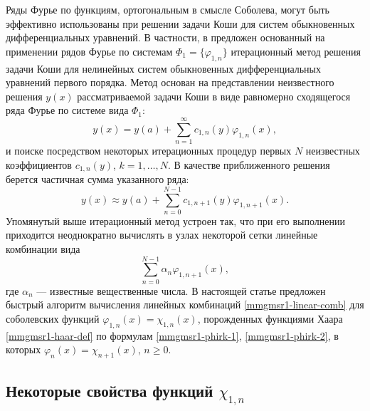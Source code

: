 Ряды Фурье по функциям, ортогональным в смысле Соболева, могут быть эффективно использованы при решении задачи Коши для систем обыкновенных дифференциальных уравнений. В частности, в \cite{mmgmsr1-ShaOdeDemi2017,mmgmsr1-ShaMagOdeCos2017,mmgmsr1-SMS-SHTI-Demi2017,mmgmsr1-SHII-MSR-Demi2017} предложен основанный на применении рядов Фурье по системам $\Phi_1=\{\varphi_{1,n}\}$ итерационный метод решения задачи Коши для нелинейных систем обыкновенных дифференциальных уравнений первого порядка. Метод основан на представлении неизвестного решения $y(x)$ рассматриваемой задачи Коши в виде равномерно сходящегося ряда Фурье по системе вида $\Phi_1$:
\begin{equation*}
y(x) = y(a)+\sum\limits_{n=1}^{\infty}
c_{1,n}(y)\varphi_{1,n}(x),
\end{equation*}
и поиске посредством некоторых итерационных процедур первых $N$ неизвестных коэффициентов $c_{1,n}(y)$, $k=1,\ldots,N$. В качестве приближенного решения берется частичная сумма указанного ряда:
\begin{equation}\label{mmgmsr1-y-part-sum}
y(x) \approx y(a)+\sum\limits_{n=0}^{N-1}
c_{1,n+1}(y)\varphi_{1,n+1}(x).
\end{equation}
Упомянутый выше итерационный метод устроен так, что при его выполнении приходится неоднократно вычислять в узлах некоторой сетки линейные комбинации вида
\begin{equation}\label{mmgmsr1-linear-comb}
\sum\limits_{n=0}^{N-1}\alpha_n\varphi_{1,n+1}(x),
\end{equation}
где $\alpha_n$ --- известные вещественные числа. В настоящей статье предложен быстрый алгоритм вычисления линейных комбинаций \eqref{mmgmsr1-linear-comb} для соболевских функций $\varphi_{1,n}(x)=\chi_{1,n}(x)$, порожденных функциями Хаара \eqref{mmgmsr1-haar-def} по формулам \eqref{mmgmsr1-phirk-1}, \eqref{mmgmsr1-phirk-2}, в которых $\varphi_n(x) = \chi_{n+1}(x)$, $n \ge 0$.

\subsection{Некоторые свойства функций $\chi_{1,n}$}

